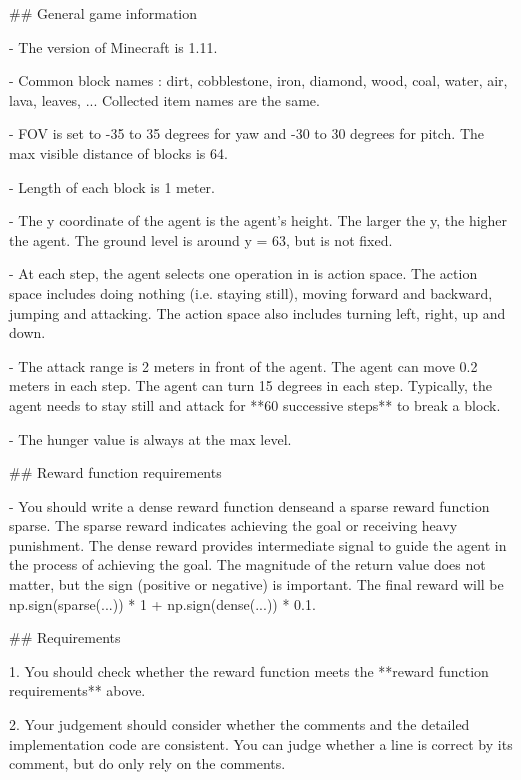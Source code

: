 \#\# General game information

- The version of Minecraft is 1.11.

- Common block names : dirt, cobblestone, iron, diamond, wood, coal, water, air, lava, leaves, ... Collected item names are the same.

- FOV is set to -35 to 35 degrees for yaw and -30 to 30 degrees for pitch. The max visible distance of blocks is 64.

- Length of each block is 1 meter.

- The y coordinate of the agent is the agent's height. The larger the y, the higher the agent. The ground level is around y = 63, but is not fixed.

- At each step, the agent selects one operation in is action space. The action space includes doing nothing (i.e. staying still), moving forward and backward, jumping and attacking. The action space also includes turning left, right, up and down. 

- The attack range is 2 meters in front of the agent. The agent can move 0.2 meters in each step. The agent can turn 15 degrees in each step. Typically, the agent needs to stay still and attack for **60 successive steps** to break a block.

- The hunger value is always at the max level.





\#\# Reward function requirements

- You should write a dense reward function \textasciigrave dense\textasciigrave  and a sparse reward function \textasciigrave sparse\textasciigrave . The sparse reward indicates achieving the goal or receiving heavy punishment. The dense reward provides intermediate signal to guide the agent in the process of achieving the goal. The magnitude of the return value does not matter, but the sign (positive or negative) is important. The final reward will be \textasciigrave np.sign(sparse(...)) * 1 + np.sign(dense(...)) * 0.1\textasciigrave .





\#\# Requirements

1. You should check whether the reward function meets the **reward function requirements** above. 

2. Your judgement should consider whether the comments and the detailed implementation code are consistent. You can judge whether a line is correct by its comment, but do only rely on the comments.

